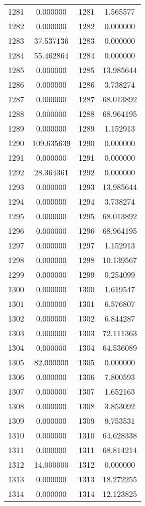 \documentclass[12pt]{article}
\begin{document}
\begin{longtable}{@{}cccc@{}}
1281 & 0.000000 & 1281 & 1.565577 \\
1282 & 0.000000 & 1282 & 0.000000 \\
1283 & 37.537136 & 1283 & 0.000000 \\
1284 & 55.462864 & 1284 & 0.000000 \\
1285 & 0.000000 & 1285 & 13.985644 \\
1286 & 0.000000 & 1286 & 3.738274 \\
1287 & 0.000000 & 1287 & 68.013892 \\
1288 & 0.000000 & 1288 & 68.964195 \\
1289 & 0.000000 & 1289 & 1.152913 \\
1290 & 109.635639 & 1290 & 0.000000 \\
1291 & 0.000000 & 1291 & 0.000000 \\
1292 & 28.364361 & 1292 & 0.000000 \\
1293 & 0.000000 & 1293 & 13.985644 \\
1294 & 0.000000 & 1294 & 3.738274 \\
1295 & 0.000000 & 1295 & 68.013892 \\
1296 & 0.000000 & 1296 & 68.964195 \\
1297 & 0.000000 & 1297 & 1.152913 \\
1298 & 0.000000 & 1298 & 10.139567 \\
1299 & 0.000000 & 1299 & 0.254099 \\
1300 & 0.000000 & 1300 & 1.619547 \\
1301 & 0.000000 & 1301 & 6.576807 \\
1302 & 0.000000 & 1302 & 6.844287 \\
1303 & 0.000000 & 1303 & 72.111363 \\
1304 & 0.000000 & 1304 & 64.536089 \\
1305 & 82.000000 & 1305 & 0.000000 \\
1306 & 0.000000 & 1306 & 7.800593 \\
1307 & 0.000000 & 1307 & 1.652163 \\
1308 & 0.000000 & 1308 & 3.853092 \\
1309 & 0.000000 & 1309 & 9.753531 \\
1310 & 0.000000 & 1310 & 64.628338 \\
1311 & 0.000000 & 1311 & 68.814214 \\
1312 & 14.000000 & 1312 & 0.000000 \\
1313 & 0.000000 & 1313 & 18.272255 \\
1314 & 0.000000 & 1314 & 12.123825 \\

\end{longtable}
\end{document}
